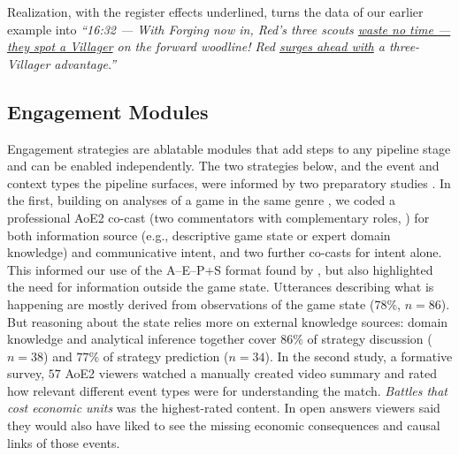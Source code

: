 \documentclass[11pt]{article}
\begin{document}
Realization, with the register effects underlined, turns the data of our earlier example into \emph{``16:32 --- With Forging now in, Red's three scouts \uline{waste no time --- they spot a Villager} on the forward woodline! Red \uline{surges ahead with} a three-Villager advantage.''}

\subsection{Engagement Modules}
\label{sec:modules}
Engagement strategies are ablatable modules that add steps to any pipeline stage and can be enabled independently. The two strategies below, and the event and context types the pipeline surfaces, were informed by two preparatory studies \citep{VanWingerden2026}. In the first, building on analyses of a game in the same genre \citep{dodge2018,penney2021}, we coded a professional AoE2 co-cast (two commentators with complementary roles, \citealp{kempecook2019}) for both information source (e.g., descriptive game state or expert domain knowledge) and communicative intent, and two further co-casts for intent alone. This informed our use of the A--E--P+S format found by \citet{dodge2018}, but also highlighted the need for information outside the game state. Utterances describing what is happening are mostly derived from observations of the game state ($78\%$, $n=86$). But reasoning about the state relies more on external knowledge sources: domain knowledge and analytical inference together cover $86\%$ of strategy discussion ($n=38$) and $77\%$ of strategy prediction ($n=34$). In the second study, a formative survey, $57$ AoE2 viewers watched a manually created video summary and rated how relevant different event types were for understanding the match. \textit{Battles that cost economic units} was the highest-rated content. In open answers viewers said they would also have liked to see the missing economic consequences and causal links of those events.
\end{document}
